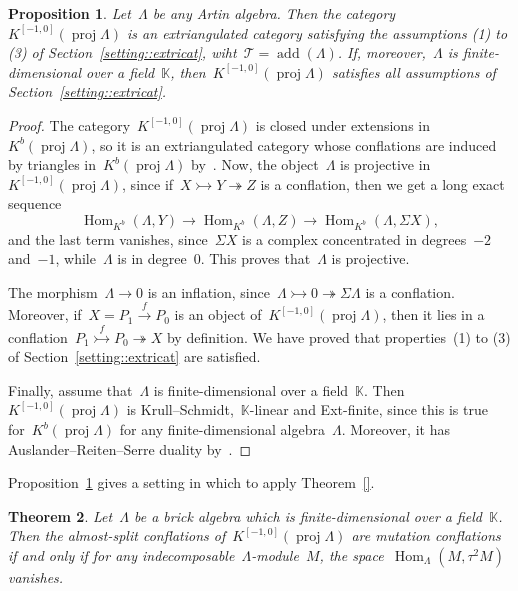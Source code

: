\documentclass{amsart}
\newtheorem{theorem}{Theorem}[section]
\newtheorem{proposition}[theorem]{Proposition}
\theoremstyle{definition}
\newcommand{\pg}[1]{\todo[color=green!30]{#1 \\ \hfill --- PG.}}
\newcommand{\field}{\mathbb{K}}
\newcommand{\Hom}[1]{\operatorname{Hom}_{#1}}
\newcommand{\susp}{\Sigma}
\newcommand{\add}{\operatorname{add}}
\newcommand{\proj}{\operatorname{proj}}
\newcommand{\tc}{\mathcal{T}}
\newcommand{\infl}{\rightarrowtail}
\newcommand{\defl}{\twoheadrightarrow}
\begin{document}
\begin{proposition}\label{prop::2kbproj-is-extriangulated}
 Let~$\Lambda$ be any Artin algebra.  Then the category~$K^{[-1,0]}(\proj \Lambda)$ is an extriangulated category satisfying the assumptions (1) to (3) of Section~\ref{setting::extricat}, wiht~$\tc = \add(\Lambda)$.  If, moreover,~$\Lambda$ is finite-dimensional over a field~$\field$, then~$K^{[-1,0]}(\proj \Lambda)$ satisfies all assumptions of Section~\ref{setting::extricat}. 
\end{proposition}
\begin{proof}
 The category~$K^{[-1,0]}(\proj \Lambda)$ is closed under extensions in~$K^b(\proj \Lambda)$, so it is an extriangulated category whose conflations are induced by triangles in~$K^b(\proj\Lambda)$ by~\cite[Remark 2.18]{NakaokaPalu}.  Now, the object~$\Lambda$ is projective in~$K^{[-1,0]}(\proj \Lambda)$, since if~$X\infl Y\defl Z$ is a conflation, then we get a long exact sequence
 \[
  \Hom{K^b}(\Lambda,Y)\to \Hom{K^b}(\Lambda,Z) \to  \Hom{K^b}(\Lambda, \susp X),
 \]
 and the last term vanishes, since~$\susp X$ is a complex concentrated in degrees~$-2$ and~$-1$, while~$\Lambda$ is in degree~$0$.  This proves that~$\Lambda$ is projective.
 
 The morphism~$\Lambda \to 0$ is an inflation, since~$\Lambda\infl 0 \defl \susp \Lambda$ is a conflation.  Moreover, if~$X= P_1\xrightarrow{f}P_0$ is an object of~$K^{[-1,0]}(\proj\Lambda)$, then it lies in a conflation~$P_1\stackrel{f}{\infl} P_0 \defl X$ by definition.  We have proved that properties~(1) to (3) of Section~\ref{setting::extricat} are satisfied.
 
 Finally, assume that~$\Lambda$ is finite-dimensional over a field~$\field$.  Then~$K^{[-1,0]}(\proj\Lambda)$ is Krull--Schmidt,~$\field$-linear and Ext-finite, since this is true for~$K^b(\proj\Lambda)$ for any finite-dimensional algebra~$\Lambda$.  Moreover, it has Auslander--Reiten--Serre duality by~\cite[Proposition 6.1]{IyamaNakaokaPalu}.
\end{proof}

Proposition~\ref{prop::2kbproj-is-extriangulated} gives a setting in which to apply Theorem~\ref{}.

\begin{theorem}\label{theo::brick-algebra-condition}
 Let~$\Lambda$ be a brick algebra which is finite-dimensional over a field~$\field$\pg{True for any Artin algebra?}.  Then the almost-split conflations of~$K^{[-1,0]}(\proj \Lambda)$ are mutation conflations if and only if for any indecomposable~$\Lambda$-module~$M$, the space~$\Hom{\Lambda}(M, \tau^2 M)$ vanishes.
\end{theorem}
\end{document}
